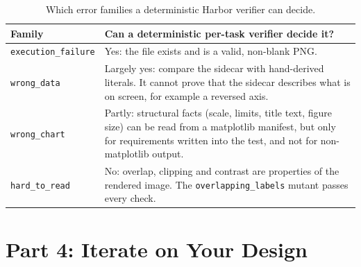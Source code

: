 \documentclass[11pt]{article}
\begin{document}
\begin{table}[h]
\centering
\small
\begin{tabular}{p{2.8cm}p{11.2cm}}
\toprule
Family & Can a deterministic per-task verifier decide it? \\
\midrule
\texttt{execution\_failure} & Yes: the file exists and is a valid, non-blank PNG. \\
\texttt{wrong\_data} & Largely yes: compare the sidecar with hand-derived literals. It cannot prove that the sidecar describes what is on screen, for example a reversed axis. \\
\texttt{wrong\_chart} & Partly: structural facts (scale, limits, title text, figure size) can be read from a matplotlib manifest, but only for requirements written into the test, and not for non-matplotlib output. \\
\texttt{hard\_to\_read} & No: overlap, clipping and contrast are properties of the rendered image. The \texttt{overlapping\_labels} mutant passes every check. \\
\bottomrule
\end{tabular}
\caption{Which error families a deterministic Harbor verifier can decide.}
\label{tab:families}
\end{table}

\section{Part 4: Iterate on Your Design}
\end{document}

